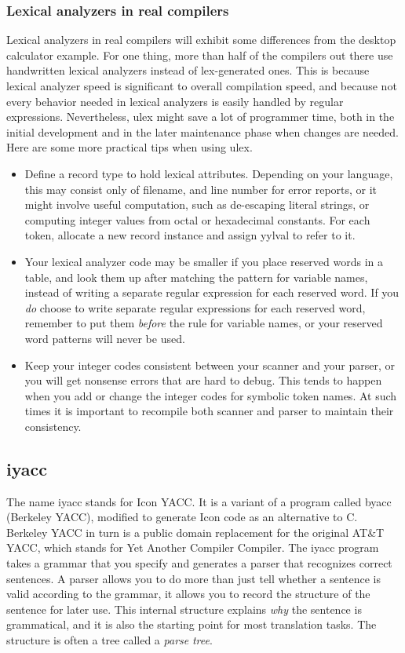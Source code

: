 \subsubsection{Lexical analyzers in real compilers}
Lexical analyzers in real compilers will exhibit some differences from
the desktop calculator example. For one thing, more than half of the
compilers out there use handwritten lexical analyzers instead of
lex-generated ones. This is because lexical analyzer speed is
significant to overall compilation speed, and because not every
behavior needed in lexical analyzers is easily handled by regular
expressions. Nevertheless, ulex might save a lot of programmer time,
both in the initial development and in the later maintenance phase when
changes are needed. Here are some more practical tips when using ulex.

\liststyleLvii
\begin{itemize}
\item Define a record type to hold lexical attributes. Depending on your
language, this may consist only of filename, and line number for error
reports, or it might involve useful computation, such as de-escaping
literal strings, or computing integer values from octal or hexadecimal
constants. For each token, allocate a new record instance and assign
\textsf{yylval} to refer to it.
\item Your lexical analyzer code may be smaller if you place reserved
words in a table, and look them up after matching the pattern for
variable names, instead of writing a separate regular expression for
each reserved word. If you \textit{do} choose to write separate regular
expressions for each reserved word, remember to put them
\textit{before} the rule for variable names, or your reserved word
patterns will never be used.
\item Keep your integer codes consistent between your scanner and your
parser, or you will get nonsense errors that are hard to debug. This
tends to happen when you add or change the integer codes for symbolic
token names. At such times it is important to recompile both scanner
and parser to maintain their consistency.
\end{itemize}
\subsection{iyacc}
The name \textsf{iyacc} stands for Icon YACC. It is a variant of a
program called \textsf{byacc} (Berkeley YACC), modified to
generate Icon code as an alternative to C. Berkeley YACC in turn is a
public domain replacement for the original AT\&T YACC, which stands for
Yet Another Compiler Compiler. The \textsf{iyacc} program takes a
grammar that you specify and
generates a parser that recognizes correct sentences. A parser allows
you to do more than just tell whether a sentence is valid according to
the grammar, it allows you to record the structure of the sentence for
later use. This internal structure explains \textit{why} the sentence
is grammatical, and it is also the starting point for most translation
tasks. The structure is often a tree called a \textit{parse }\textit{tree}.

